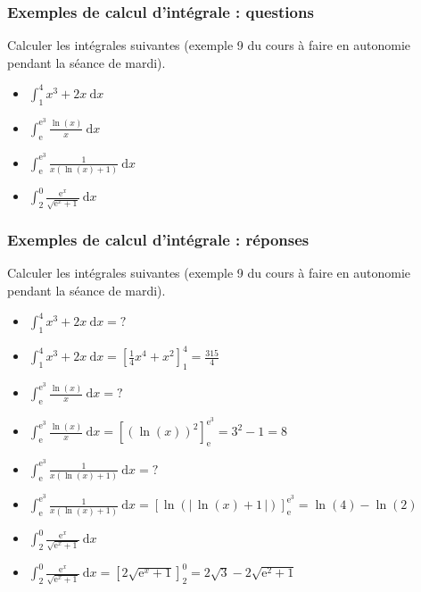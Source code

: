 \documentclass[11pt, hyperref={urlcolor=red,%
            linkcolor=blue, %
            colorlinks=true}]{beamer}
\newcommand{\dx}{\ensuremath{\text{d}x}}		%
\newcommand{\integralex}[3]{\int_{#1}^{#2} #3 \ \dx}
\newcommand{\valabs}[1]{\big| \, #1 \, \big|}
\begin{document}
\begin{frame}
\frametitle{Exemples de calcul d'intégrale : questions}
\label{calcint}

Calculer les intégrales suivantes (exemple 9 du cours à faire en autonomie pendant la séance de mardi).
\begin{itemize}
 \item $\integralex{1}{4}{x^{3}+2x}$
\item  $\integralex{\text{e}}{\text{e}^{3}}{\frac{\ln(x)}{x}}$
\item $\integralex{\text{e}}{\text{e}^{3}}{\frac{1}{x(\ln(x)+1)}}$
\item $\integralex{2}{0}{\frac{\text{e}^{x}}{\sqrt{\text{e}^{x}+1}}}$
\end{itemize}

\end{frame}


\begin{frame}
\frametitle{Exemples de calcul d'intégrale : réponses}
\label{calcint}

Calculer les intégrales suivantes (exemple 9 du cours à faire en autonomie pendant la séance de mardi).
\begin{itemize}
 \item $\integralex{1}{4}{x^{3}+2x}=?$
\pause \item  $\integralex{1}{4}{x^{3}+2x}=\left[\frac{1}{4}x^{4}+x^{2}\right]_{1}^{4}=\frac{315}{4}$
\item $\integralex{\text{e}}{\text{e}^{3}}{\frac{\ln(x)}{x}}=?$
\pause  \item  $\integralex{\text{e}}{\text{e}^{3}}{\frac{\ln(x)}{x}}=\left[(\ln(x))^{2}\right]_{\text{e}}^{\text{e}^{3}}=3^{2}-1=8$

\item $\integralex{\text{e}}{\text{e}^{3}}{\frac{1}{x(\ln(x)+1)}}=?$
\pause \item $\integralex{\text{e}}{\text{e}^{3}}{\frac{1}{x(\ln(x)+1)}}=\left[\ln(\valabs{\ln(x)+1})\right]_{\text{e}}^{\text{e}^{3}}=\ln(4)-\ln(2)$
\item $\integralex{2}{0}{\frac{\text{e}^{x}}{\sqrt{\text{e}^{x}+1}}}$
\pause \item $\integralex{2}{0}{\frac{\text{e}^{x}}{\sqrt{\text{e}^{x}+1}}}=\left[2\sqrt{\text{e}^{x}+1}\right]_{2}^{0}=2\sqrt{3}-2\sqrt{\text{e}^{2}+1}$
\end{itemize}

\end{frame}
\end{document}
